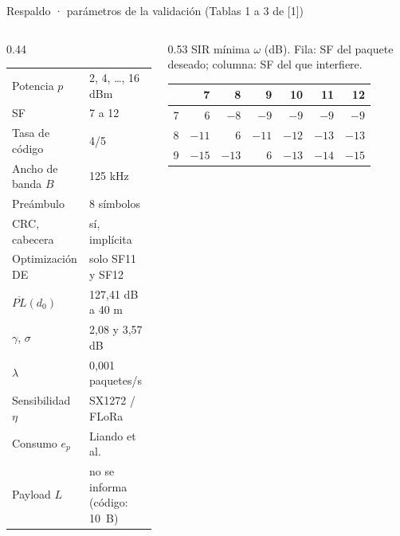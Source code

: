 \documentclass[aspectratio=169,11pt]{beamer}
\begin{document}
\appendix
\begin{frame}{Respaldo · parámetros de la validación (Tablas 1 a 3 de [1])}
  \begin{columns}[T,onlytextwidth]
    \begin{column}{0.44\textwidth}
      \footnotesize
      \renewcommand{\arraystretch}{1.12}
      \begin{tabular}{@{}ll@{}}
        \toprule
        Potencia $p$ & 2, 4, \dots, 16 dBm \\
        SF & 7 a 12 \\
        Tasa de código & 4/5 \\
        Ancho de banda $B$ & 125 kHz \\
        Preámbulo & 8 símbolos \\
        CRC, cabecera & sí, implícita \\
        Optimización DE & solo SF11 y SF12 \\
        $\overline{PL}(d_0)$ & 127,41 dB a 40 m \\
        $\gamma$, $\sigma$ & 2,08 y 3,57 dB \\
        $\lambda$ & 0,001 paquetes/s \\
        Sensibilidad $\eta$ & SX1272 / FLoRa \\
        Consumo $e_p$ & Liando et al. \\
        Payload $L$ & \textcolor{warm}{no se informa} (código: 10~B) \\
        \bottomrule
      \end{tabular}
    \end{column}
    \begin{column}{0.53\textwidth}
      {\footnotesize SIR mínima $\omega$ (dB). Fila: SF del paquete deseado; columna: SF del que interfiere.}\\[1.5mm]
      \scriptsize
      \renewcommand{\arraystretch}{1.15}
      \begin{tabular}{@{}c|rrrrrr@{}}
            & 7 & 8 & 9 & 10 & 11 & 12 \\ \hline
        7   & \textcolor{warm}{6} & $-8$ & $-9$ & $-9$ & $-9$ & $-9$ \\
        8   & $-11$ & \textcolor{warm}{6} & $-11$ & $-12$ & $-13$ & $-13$ \\
        9   & $-15$ & $-13$ & \textcolor{warm}{6} & $-13$ & $-14$ & $-15$ \\

\end{tabular}
\end{column}
\end{columns}
\end{frame}
\end{document}
